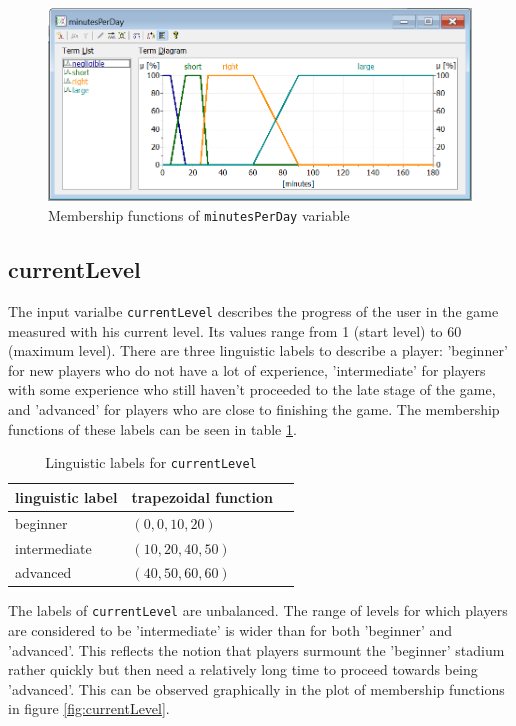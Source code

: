 \begin{figure}[H]
\centering
\includegraphics[width=\textwidth]{img/vMinutesPerDay}
\caption{Membership functions of \texttt{minutesPerDay} variable}
\label{fig:minutesPerDay} 
\end{figure}

\subsection{currentLevel}

The input varialbe \texttt{currentLevel} describes the progress of the user in the game measured with his current level. Its values range from 1 (start level) to 60 (maximum level). There are three linguistic labels to describe a player: 'beginner' for new players who do not have a lot of experience, 'intermediate' for players with some experience who still haven't proceeded to the late stage of the game, and 'advanced' for players who are close to finishing the game. The membership functions of these labels can be seen in table \ref{tab:currentLevel}.

\begin{table}[H]
\centering
\begin{tabular}{@{}lll@{}}
\toprule
\textbf{linguistic label}  & \textbf{trapezoidal function} \\ 
\midrule
beginner  & $(0,0,10,20)$ \\
intermediate & $(10,20,40,50)$ \\
advanced & $(40,50,60,60)$ \\
\bottomrule
\end{tabular}
\caption{Linguistic labels for \texttt{currentLevel}}
\label{tab:currentLevel}
\end{table}

The labels of \texttt{currentLevel} are unbalanced. The range of levels for which players are considered to be 'intermediate' is wider than for both 'beginner' and 'advanced'. This reflects the notion that players surmount the 'beginner' stadium rather quickly but then need a relatively long time to proceed towards being 'advanced'. This can be observed graphically in the plot of membership functions in figure \ref{fig:currentLevel}.

